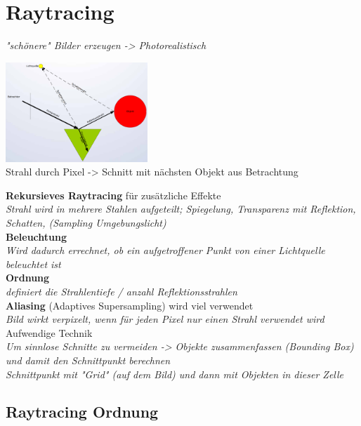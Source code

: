 \section{Raytracing}

\textit{"schönere" Bilder erzeugen -> Photorealistisch}

\includegraphics[width=0.4\textwidth]{assets/raytracing-example.png}\\

Strahl durch Pixel -> Schnitt mit nächsten Objekt aus Betrachtung

\textbf{Rekursieves Raytracing} für zusätzliche Effekte \\
\textit{Strahl wird in mehrere Stahlen aufgeteilt;
Spiegelung, Transparenz mit Reflektion, Schatten, (Sampling Umgebungslicht)}\\

\textbf{Beleuchtung} \\
\textit{Wird dadurch errechnet, ob ein aufgetroffener Punkt von einer Lichtquelle beleuchtet ist}\\

\textbf{Ordnung} \\
\textit{definiert die Strahlentiefe / anzahl Reflektionsstrahlen}\\

\textbf{Aliasing} (Adaptives Supersampling) wird viel verwendet \\
\textit{Bild wirkt verpixelt, wenn für jeden Pixel nur einen Strahl verwendet wird}\\

Aufwendige Technik \\
\textit{Um sinnlose Schnitte zu vermeiden ->
Objekte zusammenfassen (Bounding Box) und damit den Schnittpunkt berechnen}\\
\textit{Schnittpunkt mit "Grid" (auf dem Bild) und dann mit Objekten in dieser Zelle}\\

\subsection{Raytracing Ordnung}

